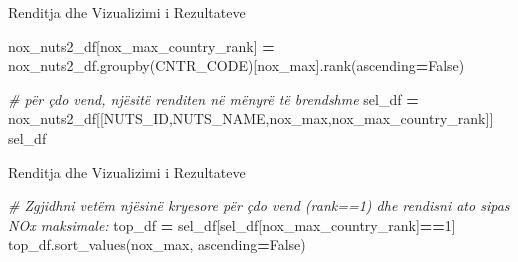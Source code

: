 \documentclass[
  ignorenonframetext,
]{beamer}
\newenvironment{Shaded}{\begin{snugshade}}{\end{snugshade}}
\newcommand{\CommentTok}[1]{\textcolor[rgb]{0.56,0.35,0.01}{\textit{#1}}}
\newcommand{\DecValTok}[1]{\textcolor[rgb]{0.00,0.00,0.81}{#1}}
\newcommand{\NormalTok}[1]{#1}
\newcommand{\OperatorTok}[1]{\textcolor[rgb]{0.81,0.36,0.00}{\textbf{#1}}}
\newcommand{\StringTok}[1]{\textcolor[rgb]{0.31,0.60,0.02}{#1}}
\newcommand{\VariableTok}[1]{\textcolor[rgb]{0.00,0.00,0.00}{#1}}
\begin{document}
\begin{frame}[fragile]{Renditja dhe Vizualizimi i Rezultateve}
\protect\hypertarget{renditja-dhe-vizualizimi-i-rezultateve-12}{}

\begin{Shaded}
\begin{Highlighting}[]
\NormalTok{nox\_nuts2\_df[}\StringTok{\textquotesingle{}nox\_max\_country\_rank\textquotesingle{}}\NormalTok{] }\OperatorTok{=}\NormalTok{ nox\_nuts2\_df.groupby(}\StringTok{\textquotesingle{}CNTR\_CODE\textquotesingle{}}\NormalTok{)[}\StringTok{\textquotesingle{}nox\_max\textquotesingle{}}\NormalTok{].rank(ascending}\OperatorTok{=}\VariableTok{False}\NormalTok{)}

\CommentTok{\# për çdo vend, njësitë renditen në mënyrë të brendshme}
\NormalTok{sel\_df }\OperatorTok{=}\NormalTok{ nox\_nuts2\_df[[}\StringTok{\textquotesingle{}NUTS\_ID\textquotesingle{}}\NormalTok{,}\StringTok{\textquotesingle{}NUTS\_NAME\textquotesingle{}}\NormalTok{,}\StringTok{\textquotesingle{}nox\_max\textquotesingle{}}\NormalTok{,}\StringTok{\textquotesingle{}nox\_max\_country\_rank\textquotesingle{}}\NormalTok{]]}
\NormalTok{sel\_df}
\end{Highlighting}
\end{Shaded}
\end{frame}

\begin{frame}[fragile]{Renditja dhe Vizualizimi i Rezultateve}
\protect\hypertarget{renditja-dhe-vizualizimi-i-rezultateve-13}{}

\begin{Shaded}
\begin{Highlighting}[]
\CommentTok{\# Zgjidhni vetëm njësinë kryesore për çdo vend (rank==1) dhe rendisni ato sipas NOx maksimale:}
\NormalTok{top\_df }\OperatorTok{=}\NormalTok{ sel\_df[sel\_df[}\StringTok{\textquotesingle{}nox\_max\_country\_rank\textquotesingle{}}\NormalTok{]}\OperatorTok{==}\DecValTok{1}\NormalTok{]}
\NormalTok{top\_df.sort\_values(}\StringTok{\textquotesingle{}nox\_max\textquotesingle{}}\NormalTok{, ascending}\OperatorTok{=}\VariableTok{False}\NormalTok{)}
\end{Highlighting}
\end{Shaded}
\end{frame}
\end{document}
